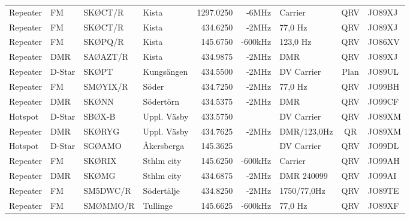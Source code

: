 \begin{landscape}
\begin{longtable}{llllrrlcl}
	Repeater          & FM           & SKØCT/R       & Kista        &         1297.0250 &          -6MHz & Carrier         &       QRV       & JO89XJ           \\
	Repeater          & FM           & SKØCT/R       & Kista        &          434.6250 &          -2MHz & 77,0 Hz         &       QRV       & JO89XJ           \\
	Repeater          & FM           & SKØPQ/R       & Kista        &          145.6750 &        -600kHz & 123,0 Hz        &       QRV       & JO86XV           \\
	Repeater          & DMR          & SAØAZT/R      & Kista        &          434.9875 &          -2MHz & DMR             &       QRV       & JO89XJ           \\
	Repeater          & D-Star       & SKØPT         & Kungsängen   &          434.5500 &          -2MHz & DV Carrier      &      Plan       & JO89UL           \\
	Repeater          & FM           & SMØYIX/R      & Söder        &          434.7250 &          -2MHz & 77,0 Hz         &       QRV       & JO99BH           \\
	Repeater          & DMR          & SKØNN         & Södertörn    &          434.5375 &          -2MHz & DMR             &       QRV       & JO99CF           \\
	Hotspot           & D-Star       & SBØX-B        & Uppl. Väsby  &          433.5750 &                & DV Carrier      &       QRV       & JO89XM           \\
	Repeater          & DMR          & SKØRYG        & Uppl. Väsby  &          434.7625 &          -2MHz & DMR/123,0Hz    &       QR        & JO89XM           \\
	Hotspot           & D-Star       & SGØAMO        & Åkersberga   &          145.3625 &                & DV Carrier      &       QRV       & JO99DL           \\
	Repeater          & FM           & SKØRIX        & Sthlm city   &          145.6250 &        -600kHz & Carrier         &       QRV       & JO99AH           \\
	Repeater          & DMR          & SKØMG         & Sthlm city   &          434.6875 &          -2MHz & DMR 240099      &       QRV       & JO99AI           \\
	Repeater          & FM           & SM5DWC/R      & Södertälje   &          434.8250 &          -2MHz & 1750/77,0Hz    &       QRV       & JO89TE           \\
	Repeater          & FM           & SMØMMO/R      & Tullinge     &          145.6625 &        -600kHz & 77,0 Hz         &       QRV       & JO89XF           \\

\end{longtable}
\end{landscape}
